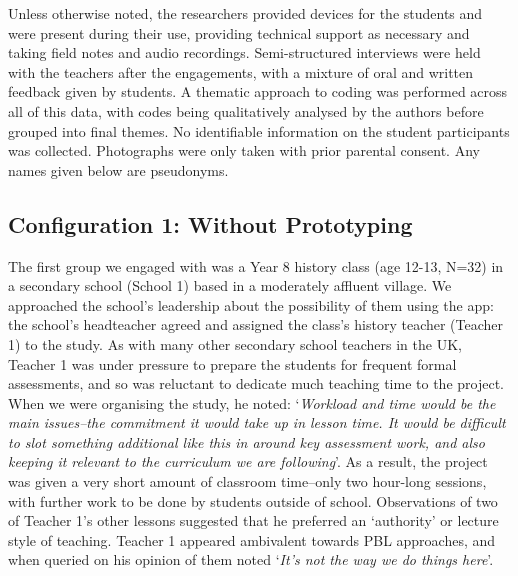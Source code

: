 \documentclass[,hyphens]{sigchi}
\begin{document}
Unless otherwise noted, the researchers provided devices for the students and were present during their use, providing technical support as necessary and taking field notes and audio recordings. Semi-structured interviews were held with the teachers after the engagements, with a mixture of oral and written feedback given by students. A thematic approach to coding was performed across all of this data, with codes being qualitatively analysed by the authors before grouped into final themes. No identifiable information on the student participants was collected. Photographs were only taken with prior parental consent. Any names given below are pseudonyms.

\subsection{Configuration 1: Without Prototyping}
The first group we engaged with was a Year 8 history class (age 12-13, N=32) in a secondary school (School 1) based in a moderately affluent village. We approached the school's leadership about the possibility of them using the app: the school's headteacher agreed and assigned the class's history teacher (Teacher 1) to the study. As with many other secondary school teachers in the UK, Teacher 1 was under pressure to prepare the students for frequent formal assessments, and so was reluctant to dedicate much teaching time to the project. When we were organising the study, he noted: `\textit{Workload and time would be the main issues--the commitment it would take up in lesson time. It would be difficult to slot something additional like this in around key assessment work, and also keeping it relevant to the curriculum we are following}'. As a result, the project was given a very short amount of classroom time--only two hour-long sessions, with further work to be done by students outside of school. Observations of two of Teacher 1's other lessons suggested that he preferred an `authority' or lecture style of teaching. Teacher 1 appeared ambivalent towards PBL approaches, and when queried on his opinion of them noted `\textit{It's not the way we do things here}'.
\end{document}
